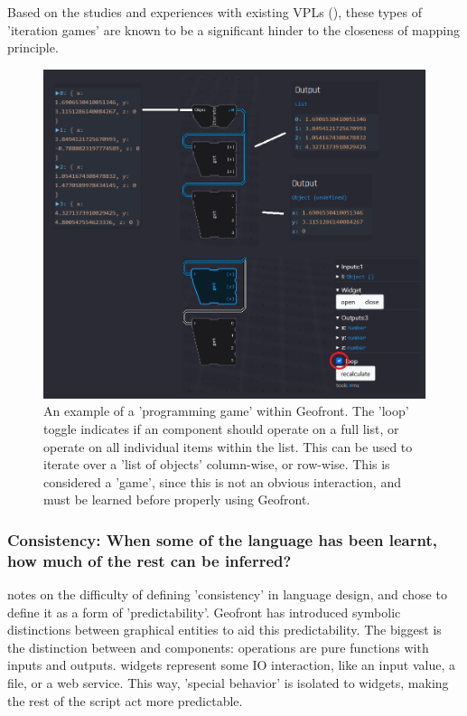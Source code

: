 Based on the studies and experiences with existing VPLs (), these types of 'iteration games' are known to be a significant hinder to the closeness of mapping principle.

\begin{figure}
  \graphicspath{{../../assets/images/6.2/}}
  \centering
  \includegraphics[width=\linewidth]{programming-game.PNG}
  \caption[]{An example of a 'programming game' within Geofront. The 'loop' toggle  indicates if an component should operate on a full list, or operate on all individual items within the list. 
  This can be used to iterate over a 'list of objects' column-wise, or row-wise. This is considered a 'game', since this is not an obvious interaction, and must be learned before properly using Geofront. }
  \label{fig:programming-game}
\end{figure}
 

\subsubsection*{Consistency: When some of the language has been learnt, how much of the rest can be inferred?}

\cite[]{green_usability_1996} notes on the difficulty of defining 'consistency' in language design, and chose to define it as a form of 'predictability'.
Geofront has introduced symbolic distinctions between graphical entities to aid this predictability. 
The biggest is the distinction between  and  components: 
operations are pure functions with inputs and outputs. 
widgets represent some IO interaction, like an input value, a file, or a web service. 
This way, 'special behavior' is isolated to widgets, making the rest of the script act more predictable. 

